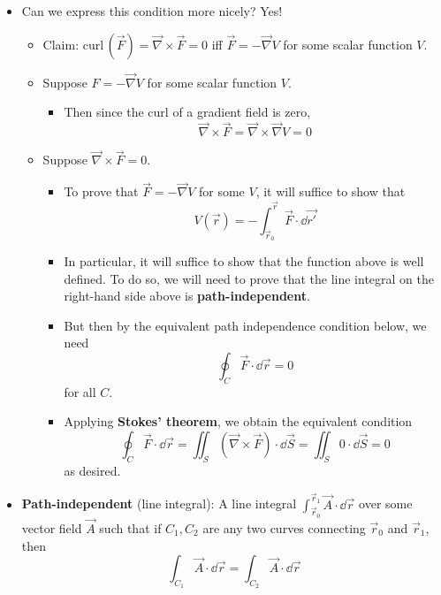\documentclass[../notes.tex]{subfiles}
\begin{document}
\begin{itemize}
    \item Can we express this condition more nicely? Yes!
    \begin{itemize}
        \item Claim: $\text{curl}\,(\vec{F})=\vec{\nabla}\times\vec{F}=0$ iff $\vec{F}=-\vec{\nabla}V$ for some scalar function $V$.
        \item Suppose $F=-\vec{\nabla}V$ for some scalar function $V$.
        \begin{itemize}
            \item Then since the curl of a gradient field is zero,
            \begin{equation*}
                \vec{\nabla}\times\vec{F} = \vec{\nabla}\times\vec{\nabla}V = 0
            \end{equation*}
        \end{itemize}
        \item Suppose $\vec{\nabla}\times\vec{F}=0$.
        \begin{itemize}
            \item To prove that $\vec{F}=-\vec{\nabla}V$ for some $V$, it will suffice to show that
            \begin{equation*}
                V(\vec{r}) = -\int_{\vec{r}_0}^{\vec{r}}\vec{F}\cdot\dd\vec{r'}
            \end{equation*}
            \item In particular, it will suffice to show that the function above is well defined. To do so, we will need to prove that the line integral on the right-hand side above is \textbf{path-independent}.
            \item But then by the equivalent path independence condition below, we need
            \begin{equation*}
                \oint_C\vec{F}\cdot\dd\vec{r} = 0
            \end{equation*}
            for all $C$.
            \item Applying \textbf{Stokes' theorem}, we obtain the equivalent condition
            \begin{equation*}
                \oint_C\vec{F}\cdot\dd\vec{r} = \iint_S(\vec{\nabla}\times\vec{F})\cdot\dd{\vec{S}} = \iint_S0\cdot\dd{\vec{S}} = 0
            \end{equation*}
            as desired.
        \end{itemize}
    \end{itemize}
    \item \textbf{Path-independent} (line integral): A line integral $\int_{\vec{r}_0}^{\vec{r}_1}\vec{A}\cdot\dd\vec{r}$ over some vector field $\vec{A}$ such that if $C_1,C_2$ are any two curves connecting $\vec{r}_0$ and $\vec{r}_1$, then
    \begin{equation*}
        \int_{C_1}\vec{A}\cdot\dd\vec{r} = \int_{C_2}\vec{A}\cdot\dd\vec{r}
    \end{equation*}
    \begin{figure}[h!]
        \centering
\end{figure}
\end{itemize}
\end{document}
